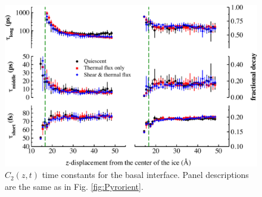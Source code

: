 \begin{figure}
\includegraphics[width=\linewidth]{Figures/Bas_lcorrz}
\caption{\label{fig:Borient} $C_2(z,t)$ time constants for the basal
  interface.  Panel descriptions are the same as in
  Fig. \ref{fig:Pyrorient}. }
\end{figure}

